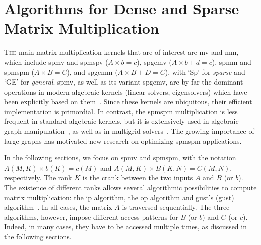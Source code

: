 
\section{Algorithms for Dense and Sparse Matrix Multiplication}
\label{sec:bg:algos}

\lettrine{T}{he} main matrix multiplication kernels that are of interest are \acrfull{mv} and \acrfull{mm}, which include \acrshort{spmv} and \acrshort{spmspv} ($A \times b = c$), \acrshort{spgemv} ($A \times b + d = c$), \acrshort{spmm} and \acrshort{spmspm} ($A \times B = C$), and \acrshort{spgemm} ($A \times B + D = C$), with `Sp' for \emph{sparse} and `GE' for \emph{general}.
\acrshort{spmv}, as well as its variant \acrshort{spgemv}, are by far the dominant operations in modern algebraic kernels (linear solvers, eigensolvers) which have been explicitly based on them~\cite{Gilbert2008, Duff2002_SparseBLAS, Penn2006, Yamazaki2011, Itoh1995, Kjolstad2017_TACO, Hapla2013}.
Since these kernels are ubiquitous, their efficient implementation is primordial.
In contrast, the \acrshort{spmspm} multiplication is less frequent in standard algebraic kernels, but it is extensively used in algebraic graph manipulation~\cite{Dongen2000, Kepner2015, Gilbert2007, Rabin1989, Chan2007, Azad2015, Brin1998}, as well as in multigrid solvers~\cite{Brandt2003, Li2021, Ryabkov2022, Ayyar2023}.
The growing importance of large graphs has motivated new research on optimizing \acrshort{spmspm} applications.

In the following sections, we focus on \acrshort{spmv} and \acrshort{spmspm}, with the notation $A(M,K) \times b(K) = c(M)$ and  $A(M,K) \times B(K,N) = C(M,N)$, respectively.
The \gls{rank} $K$ is the \gls{crank} between the two inputs $A$ and $B$ (or $b$).
The existence of different \glspl{rank} allows several algorithmic possibilities to compute matrix multiplication: the \acrfull{ip} algorithm, the \acrfull{op} algorithm and \acrlong{gust}'s (\acrshort{gust}) algorithm~\cite{Faddeev1981_InnerOuter, Gustavson1978_GustAlgo}.
In all cases, the matrix $A$ is traversed sequentially.
The three algorithms, however, impose different access patterns for $B$ (or $b$) and $C$ (or $c$).
Indeed, in many cases, they have to be accessed multiple times, as discussed in the following sections.


